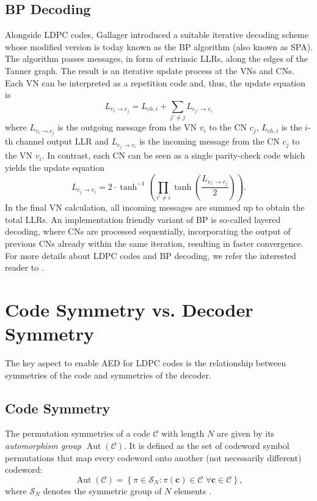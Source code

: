 \documentclass[conference]{IEEEtran}
\newcommand\new[1]{#1}
\begin{document}
\begin{NoHyper}
\subsection{BP Decoding}\label{ssec:bpdecoding}
Alongside \ac{LDPC} codes, Gallager introduced a suitable iterative decoding scheme \cite{Gallager} whose modified version is today known as the \ac{BP} algorithm (also known as \ac{SPA}). The algorithm passes messages, in form of extrinsic \acp{LLR}, along the edges of the Tanner graph. The result is an iterative update process at the \acp{VN} and \acp{CN}.
Each \ac{VN} can be interpreted as a repetition code and, thus, the update equation is
\begin{equation}\label{eq: vn_update}
    L_{v_i \rightarrow c_j} = L_{ch,i} + \sum_{j'\neq j}L_{c_{j'}\rightarrow v_i}
\end{equation}
where $L_{v_i \rightarrow c_j}$ is the outgoing message from the \ac{VN} $v_i$ to the \ac{CN} $c_j$,  $L_{ch,i}$ is the $i$-th channel output \ac{LLR} and $L_{c_{j}\rightarrow v_i}$ is the incoming message from the \ac{CN} $c_j$ to the \ac{VN} $v_i$. In contrast, each \ac{CN} can be seen as a single parity-check code which yields the update equation
\begin{equation}
    L_{c_j \rightarrow v_i} = 2\cdot \tanh^{-1}\left( \prod_{i'\neq i} \tanh \left(\frac{ L_{v_{i'}\rightarrow c_j}}{2} \right) \right).
\end{equation}
\new{In the final \ac{VN} calculation, all incoming messages are summed up to obtain the total \acp{LLR}. An implementation friendly variant of \ac{BP} is so-called layered decoding, where \acp{CN} are processed sequentially, incorporating the output of previous \acp{CN} already within the same iteration, resulting in faster convergence.}
For more details about \ac{LDPC} codes and \ac{BP} decoding, we refer the interested reader to \cite{densityEvol}.

\section{Code Symmetry vs. Decoder Symmetry}
The key aspect to enable \ac{AED} for \ac{LDPC} codes is the relationship between symmetries of the code and symmetries of the decoder. 

\subsection{Code Symmetry}
The permutation symmetries of a code $\mathcal{C}$ with length $N$ are given by its \textit{automorphism group} $\operatorname{Aut}(\mathcal{C})$. It is defined as the set of codeword symbol permutations that map every codeword onto another (not necessarily different) codeword:
\begin{equation}
    \operatorname{Aut}(\mathcal{C}) = \left\{\pi \in \mathcal{S}_N: \pi(\mathbf{c}) \in \mathcal{C} \; \forall \mathbf{c} \in \mathcal{C}\right\},
\end{equation}
where $\mathcal{S}_N$ denotes the symmetric group of $N$ elements \cite{macwilliams77}.


\end{NoHyper}
\end{document}
